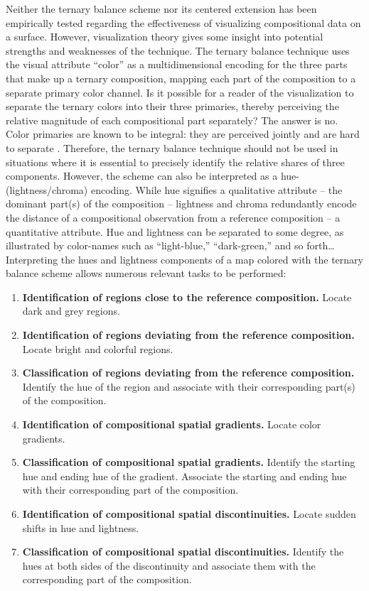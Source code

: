 \documentclass[10pt, twoside, parskip=half]{article}
\providecommand{\tightlist}{%
  \setlength{\itemsep}{0pt}\setlength{\parskip}{0pt}}
\begin{document}
Neither the ternary balance scheme nor its centered extension has been
empirically tested regarding the effectiveness of visualizing
compositional data on a surface. However, visualization theory gives
some insight into potential strengths and weaknesses of the technique.
The ternary balance technique uses the visual attribute ``color'' as a
multidimensional encoding for the three parts that make up a ternary
composition, mapping each part of the composition to a separate primary
color channel. Is it possible for a reader of the visualization to
separate the ternary colors into their three primaries, thereby
perceiving the relative magnitude of each compositional part separately?
The answer is no. Color primaries are known to be integral: they are
perceived jointly and are hard to separate \citep{Ware2013}. Therefore,
the ternary balance technique should not be used in situations where it
is essential to precisely identify the relative shares of three
components. However, the scheme can also be interpreted as a
hue-(lightness/chroma) encoding. While hue signifies a qualitative
attribute -- the dominant part(s) of the composition -- lightness and
chroma redundantly encode the distance of a compositional observation
from a reference composition -- a quantitative attribute. Hue and
lightness can be separated to some degree, as illustrated by color-names
such as ``light-blue,'' ``dark-green,'' and so forth\ldots{}
Interpreting the hues and lightness components of a map colored with the
ternary balance scheme allows numerous relevant tasks to be performed:

\begin{enumerate}
\def\labelenumi{\arabic{enumi}.}
\tightlist
\item
  \textbf{Identification of regions close to the reference composition.}
  Locate dark and grey regions.
\item
  \textbf{Identification of regions deviating from the reference
  composition.} Locate bright and colorful regions.
\item
  \textbf{Classification of regions deviating from the reference
  composition.} Identify the hue of the region and associate with their
  corresponding part(s) of the composition.
\item
  \textbf{Identification of compositional spatial gradients.} Locate
  color gradients.
\item
  \textbf{Classification of compositional spatial gradients.} Identify
  the starting hue and ending hue of the gradient. Associate the
  starting and ending hue with their corresponding part of the
  composition.
\item
  \textbf{Identification of compositional spatial discontinuities.}
  Locate sudden shifts in hue and lightness.
\item
  \textbf{Classification of compositional spatial discontinuities.}
  Identify the hues at both sides of the discontinuity and associate
  them with the corresponding part of the composition.
\end{enumerate}
\end{document}
